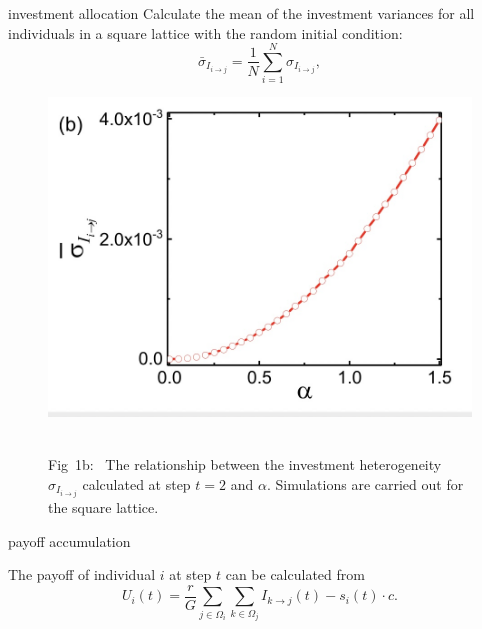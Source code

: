 \documentclass[notheorems,11pt,compress]{beamer}
\numberwithin{figure}{section}
\numberwithin{table}{section}
\numberwithin{equation}{section}
\theoremstyle{plain}
\numberwithin{theorem}{section}
\numberwithin{definition}{section}
\numberwithin{lemma}{section}
\numberwithin{proposition}{section}
\numberwithin{corollary}{section}
\theoremstyle{example}
\begin{document}
\begin{frame}{investment allocation}
	Calculate the mean of the investment variances for all individuals in a square lattice with the random initial condition:
	\begin{equation}
		\bar{\sigma}_{I_{i \rightarrow j}}=\frac{1}{N} \sum_{i=1}^N \sigma_{I_{i \rightarrow j}},
	\end{equation}

	\begin{figure}[H]
		\centering
		\includegraphics[width=0.52\linewidth]{1b}
		\,
		\parbox[b]{.45\textwidth}{Fig\ 1b: \ The relationship between the investment heterogeneity $\sigma_{I_{i \rightarrow j}}$ calculated at step $t = 2$ and $\alpha$. Simulations are carried out for the square lattice.\vspace*{3em}}
		\label{fig1b}
	\end{figure}
\end{frame}


\begin{frame}{payoff accumulation}

	The payoff of individual $i$ at step $t$ can be calculated from
	\begin{equation}
		U_i(t)=\frac{r}{G} \sum_{j \in \Omega_i} \sum_{k \in \Omega_j} I_{k \rightarrow j}(t)-s_i(t) \cdot c.
	\end{equation}

\end{frame}


\end{document}
